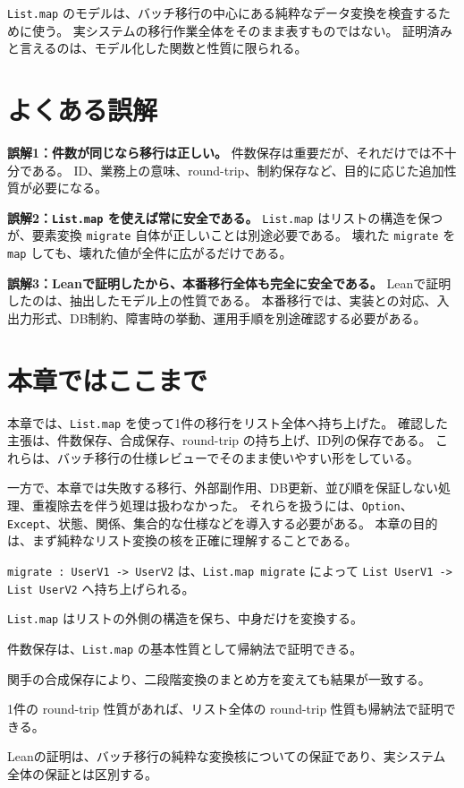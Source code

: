 \begin{softwarebox}
\texttt{List.map} のモデルは、バッチ移行の中心にある純粋なデータ変換を検査するために使う。
実システムの移行作業全体をそのまま表すものではない。
証明済みと言えるのは、モデル化した関数と性質に限られる。
\end{softwarebox}

\section{よくある誤解}

\begin{warningbox}
\textbf{誤解1：件数が同じなら移行は正しい。}
件数保存は重要だが、それだけでは不十分である。
ID、業務上の意味、round-trip、制約保存など、目的に応じた追加性質が必要になる。

\medskip
\textbf{誤解2：\texttt{List.map} を使えば常に安全である。}
\texttt{List.map} はリストの構造を保つが、要素変換 \texttt{migrate} 自体が正しいことは別途必要である。
壊れた \texttt{migrate} を \texttt{map} しても、壊れた値が全件に広がるだけである。

\medskip
\textbf{誤解3：Leanで証明したから、本番移行全体も完全に安全である。}
Leanで証明したのは、抽出したモデル上の性質である。
本番移行では、実装との対応、入出力形式、DB制約、障害時の挙動、運用手順を別途確認する必要がある。
\end{warningbox}

\section{本章ではここまで}

本章では、\texttt{List.map} を使って1件の移行をリスト全体へ持ち上げた。
確認した主張は、件数保存、合成保存、round-trip の持ち上げ、ID列の保存である。
これらは、バッチ移行の仕様レビューでそのまま使いやすい形をしている。

一方で、本章では失敗する移行、外部副作用、DB更新、並び順を保証しない処理、重複除去を伴う処理は扱わなかった。
それらを扱うには、\texttt{Option}、\texttt{Except}、状態、関係、集合的な仕様などを導入する必要がある。
本章の目的は、まず純粋なリスト変換の核を正確に理解することである。

\texttt{migrate : UserV1 -> UserV2} は、\texttt{List.map migrate} によって \texttt{List UserV1 -> List UserV2} へ持ち上げられる。

\texttt{List.map} はリストの外側の構造を保ち、中身だけを変換する。

件数保存は、\texttt{List.map} の基本性質として帰納法で証明できる。

関手の合成保存により、二段階変換のまとめ方を変えても結果が一致する。

1件の round-trip 性質があれば、リスト全体の round-trip 性質も帰納法で証明できる。

Leanの証明は、バッチ移行の純粋な変換核についての保証であり、実システム全体の保証とは区別する。
